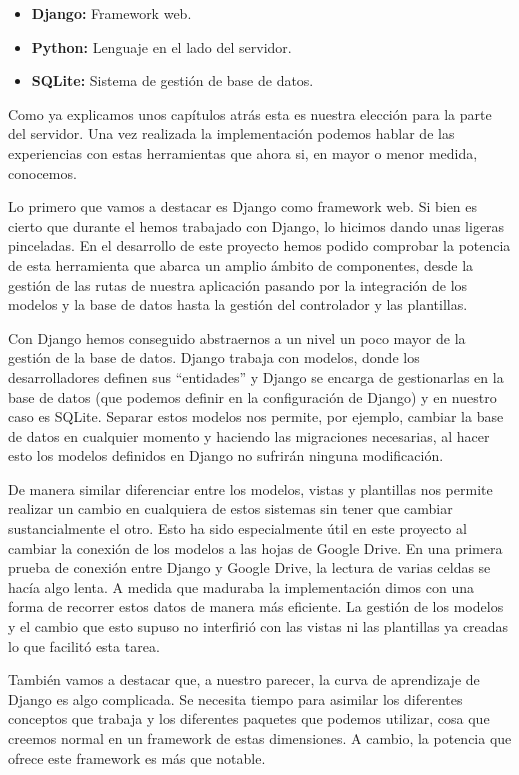 \begin{itemize}
  \item \textbf{Django:} Framework web.
  \item \textbf{Python:} Lenguaje en el lado del servidor.
  \item \textbf{SQLite:} Sistema de gestión de base de datos.
\end{itemize}

\bigskip
Como ya explicamos unos capítulos atrás esta es nuestra elección para la parte del servidor. Una vez realizada la implementación podemos hablar de las experiencias con estas herramientas que ahora si, en mayor o menor medida, conocemos.

\bigskip
Lo primero que vamos a destacar es Django como framework web. Si bien es cierto que durante el {\grado} hemos trabajado con Django, lo hicimos dando unas ligeras pinceladas. En el desarrollo de este proyecto hemos podido comprobar la potencia de esta herramienta que abarca un amplio ámbito de componentes, desde la gestión de las rutas de nuestra aplicación pasando por la integración de los modelos y la base de datos hasta la gestión del controlador y las plantillas.

\bigskip
Con Django hemos conseguido abstraernos a un nivel un poco mayor de la gestión de la base de datos. Django trabaja con modelos, donde los desarrolladores definen sus ``entidades'' y Django se encarga de gestionarlas en la base de datos (que podemos definir en la configuración de Django) y en nuestro caso es SQLite. Separar estos modelos nos permite, por ejemplo, cambiar la base de datos en cualquier momento y haciendo las migraciones necesarias, al hacer esto los modelos definidos en Django no sufrirán ninguna modificación.

\bigskip
De manera similar diferenciar entre los modelos, vistas y plantillas nos permite realizar un cambio en cualquiera de estos sistemas sin tener que cambiar sustancialmente el otro. Esto ha sido especialmente útil en este proyecto al cambiar la conexión de los modelos a las hojas de Google Drive. En una primera prueba de conexión entre Django y Google Drive, la lectura de varias celdas se hacía algo lenta. A medida que maduraba la implementación dimos con una forma de recorrer estos datos de manera más eficiente. La gestión de los modelos y el cambio que esto supuso no interfirió con las vistas ni las plantillas ya creadas lo que facilitó esta tarea.

\bigskip
También vamos a destacar que, a nuestro parecer, la curva de aprendizaje de Django es algo complicada. Se necesita tiempo para asimilar los diferentes conceptos que trabaja y los diferentes paquetes que podemos utilizar, cosa que creemos normal en un framework de estas dimensiones. A cambio, la potencia que ofrece este framework es más que notable.




